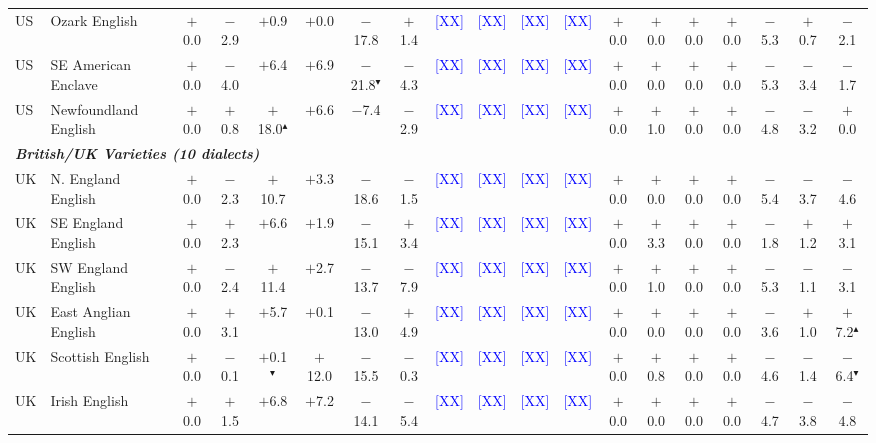 \begin{table}[t]
\begin{tabular}{llccccccccccccccccc}
US & Ozark English & $+$0.0 & $-$2.9 & $+$0.9 & $+$0.0 & $-$17.8 & $+$1.4 & \textcolor{blue}{[XX]} & \textcolor{blue}{[XX]} & \textcolor{blue}{[XX]} & \textcolor{blue}{[XX]} & $+$0.0 & $+$0.0 & $+$0.0 & $+$0.0 & $-$5.3 & $+$0.7 & $-$2.1 \\
US & SE American Enclave & $+$0.0 & $-$4.0 & $+$6.4 & $+$6.9 & $-$21.8$^\blacktriangledown$ & $-$4.3 & \textcolor{blue}{[XX]} & \textcolor{blue}{[XX]} & \textcolor{blue}{[XX]} & \textcolor{blue}{[XX]} & $+$0.0 & $+$0.0 & $+$0.0 & $+$0.0 & $-$5.3 & $-$3.4 & $-$1.7 \\
US & Newfoundland English & $+$0.0 & $+$0.8 & $+$18.0$^\blacktriangle$ & $+$6.6 & $-$7.4 & $-$2.9 & \textcolor{blue}{[XX]} & \textcolor{blue}{[XX]} & \textcolor{blue}{[XX]} & \textcolor{blue}{[XX]} & $+$0.0 & $+$1.0 & $+$0.0 & $+$0.0 & $-$4.8 & $-$3.2 & $+$0.0 \\
\midrule
\multicolumn{19}{l}{\textit{\textbf{British/UK Varieties (10 dialects)}}} \\
UK & N. England English & $+$0.0 & $-$2.3 & $+$10.7 & $+$3.3 & $-$18.6 & $-$1.5 & \textcolor{blue}{[XX]} & \textcolor{blue}{[XX]} & \textcolor{blue}{[XX]} & \textcolor{blue}{[XX]} & $+$0.0 & $+$0.0 & $+$0.0 & $+$0.0 & $-$5.4 & $-$3.7 & $-$4.6 \\
UK & SE England English & $+$0.0 & $+$2.3 & $+$6.6 & $+$1.9 & $-$15.1 & $+$3.4 & \textcolor{blue}{[XX]} & \textcolor{blue}{[XX]} & \textcolor{blue}{[XX]} & \textcolor{blue}{[XX]} & $+$0.0 & $+$3.3 & $+$0.0 & $+$0.0 & $-$1.8 & $+$1.2 & $+$3.1 \\
UK & SW England English & $+$0.0 & $-$2.4 & $+$11.4 & $+$2.7 & $-$13.7 & $-$7.9 & \textcolor{blue}{[XX]} & \textcolor{blue}{[XX]} & \textcolor{blue}{[XX]} & \textcolor{blue}{[XX]} & $+$0.0 & $+$1.0 & $+$0.0 & $+$0.0 & $-$5.3 & $-$1.1 & $-$3.1 \\
UK & East Anglian English & $+$0.0 & $+$3.1 & $+$5.7 & $+$0.1 & $-$13.0 & $+$4.9 & \textcolor{blue}{[XX]} & \textcolor{blue}{[XX]} & \textcolor{blue}{[XX]} & \textcolor{blue}{[XX]} & $+$0.0 & $+$0.0 & $+$0.0 & $+$0.0 & $-$3.6 & $+$1.0 & $+$7.2$^\blacktriangle$ \\
UK & Scottish English & $+$0.0 & $-$0.1 & $+$0.1$^\blacktriangledown$ & $+$12.0 & $-$15.5 & $-$0.3 & \textcolor{blue}{[XX]} & \textcolor{blue}{[XX]} & \textcolor{blue}{[XX]} & \textcolor{blue}{[XX]} & $+$0.0 & $+$0.8 & $+$0.0 & $+$0.0 & $-$4.6 & $-$1.4 & $-$6.4$^\blacktriangledown$ \\
UK & Irish English & $+$0.0 & $+$1.5 & $+$6.8 & $+$7.2 & $-$14.1 & $-$5.4 & \textcolor{blue}{[XX]} & \textcolor{blue}{[XX]} & \textcolor{blue}{[XX]} & \textcolor{blue}{[XX]} & $+$0.0 & $+$0.0 & $+$0.0 & $+$0.0 & $-$4.7 & $-$3.8 & $-$4.8 \\

\end{tabular}
\end{table}
